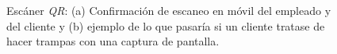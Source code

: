 \begin{figure}[H]
\caption{Escáner \textit{QR}: (a) Confirmación de escaneo en móvil del empleado y del cliente y (b) ejemplo de lo que pasaría si un cliente tratase de hacer trampas con una captura de pantalla.}
\end{figure}
